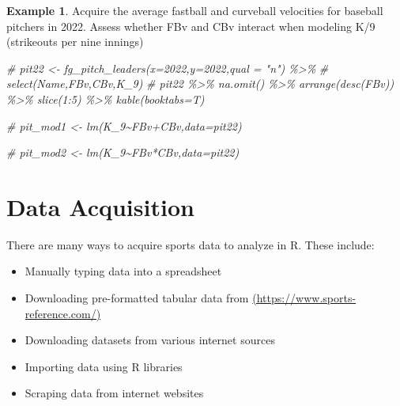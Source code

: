 \documentclass[
  11pt,
]{book}
\newenvironment{Shaded}{\begin{snugshade}}{\end{snugshade}}
\newcommand{\CommentTok}[1]{\textcolor[rgb]{0.56,0.35,0.01}{\textit{#1}}}
\providecommand{\tightlist}{%
  \setlength{\itemsep}{0pt}\setlength{\parskip}{0pt}}
\theoremstyle{definition}
\theoremstyle{definition}
\newtheorem{example}{Example}[chapter]
\theoremstyle{definition}
\theoremstyle{definition}
\theoremstyle{remark}
\begin{document}
\newpage

\begin{example}
Acquire the average fastball and curveball velocities for baseball pitchers in 2022. Assess whether FBv and CBv interact when modeling K/9 (strikeouts per nine innings)
\end{example}

\begin{Shaded}
\begin{Highlighting}[]
\CommentTok{\# pit22 \textless{}{-} fg\_pitch\_leaders(x=2022,y=2022,qual = "n") \%\textgreater{}\%}
\CommentTok{\#   select(Name,FBv,CBv,\textasciigrave{}K\_9\textasciigrave{})}
\CommentTok{\# pit22 \%\textgreater{}\% na.omit() \%\textgreater{}\% arrange(desc(FBv)) \%\textgreater{}\% slice(1:5) \%\textgreater{}\% kable(booktabs=T)}
\end{Highlighting}
\end{Shaded}

\begin{Shaded}
\begin{Highlighting}[]
\CommentTok{\# pit\_mod1 \textless{}{-} lm(K\_9\textasciitilde{}FBv+CBv,data=pit22)}
\end{Highlighting}
\end{Shaded}

\begin{Shaded}
\begin{Highlighting}[]
\CommentTok{\# pit\_mod2 \textless{}{-} lm(K\_9\textasciitilde{}FBv*CBv,data=pit22)}
\end{Highlighting}
\end{Shaded}

\hypertarget{data-acquisition}{%
\chapter{Data Acquisition}\label{data-acquisition}}

There are many ways to acquire sports data to analyze in R. These include:

\begin{itemize}
\tightlist
\item
  Manually typing data into a spreadsheet
\item
  Downloading pre-formatted tabular data from \href{https://www.sports-reference.com/}{(https://www.sports-reference.com/)}
\item
  Downloading datasets from various internet sources
\item
  Importing data using R libraries
\item
  Scraping data from internet websites
\end{itemize}
\end{document}
